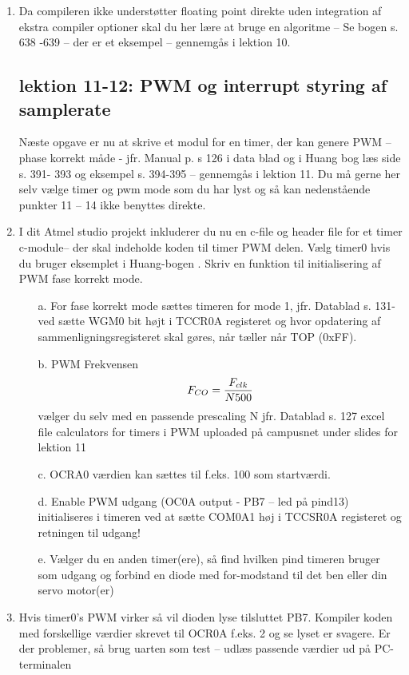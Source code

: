 \documentclass[a4paper,11pt]{article}
\theoremstyle{mytheor}
\begin{document}
\begin{enumerate}
\item Da compileren ikke understøtter floating point direkte uden integration af ekstra compiler optioner skal du her lære at bruge en algoritme – Se bogen s. 638 -639 – der er et eksempel – gennemgås i lektion 10. 
\subsection{lektion 11-12: PWM og interrupt styring af samplerate}
Næste opgave er nu at skrive et modul for en timer, der kan genere PWM – phase korrekt måde - jfr. Manual p. s 126 i data blad og i Huang bog læs side s. 391- 393 og eksempel s. 394-395 – gennemgås i lektion 11. Du må gerne her selv vælge timer og pwm mode som du har lyst og så kan nedenstående punkter 11 – 14 ikke benyttes direkte. 
\item	I dit Atmel studio projekt inkluderer du nu en c-file og header file for et timer c-module– der skal indeholde koden til timer PWM delen. Vælg timer0 hvis du bruger eksemplet i Huang-bogen . Skriv en funktion til initialisering af PWM fase korrekt mode. 
\begin{enumerate}
\item[a.] 	For fase korrekt mode sættes timeren for mode 1, jfr. Datablad s. 131- ved sætte WGM0 bit højt i TCCR0A registeret og hvor opdatering af sammenligningsregisteret skal gøres, når tæller når TOP (0xFF). 
\item[b.] PWM Frekvensen \[ F_{CO}=  \frac{F_{clk}}{N\*500} \] vælger du selv med en passende prescaling N   jfr. Datablad s. 127  excel file calculators for timers i PWM uploaded på campusnet under slides for lektion 11

\item[c.] 	OCRA0 værdien kan sættes til f.eks. 100 som startværdi.
\item[d.] 	Enable PWM udgang (OC0A output - PB7 – led på pind13) initialiseres i timeren ved at sætte COM0A1 høj i TCCSR0A registeret og retningen til udgang! 
\item[e.] 	Vælger du en anden timer(ere), så find hvilken pind timeren bruger som udgang og forbind en diode med for-modstand til det ben eller din servo motor(er) 
\end{enumerate}
\item  Hvis timer0's PWM virker så vil dioden lyse tilsluttet PB7. Kompiler koden med forskellige værdier skrevet til OCR0A f.eks. 2 og se lyset er svagere. Er der problemer, så brug uarten som test – udlæs passende værdier ud på PC-terminalen 


\end{enumerate}
\end{document}
